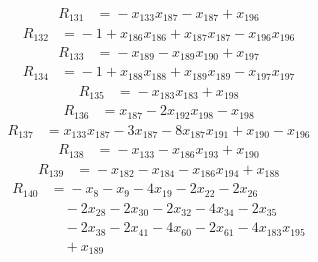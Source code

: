 \begin{align*}
R_{131}&={}-x_{133}x_{187} -x_{187} +x_{196}
\end{align*}
\begin{align*}
R_{132}&={}-1 +x_{186}x_{186} +x_{187}x_{187} -x_{196}x_{196}
\end{align*}
\begin{align*}
R_{133}&={}-x_{189} -x_{189}x_{190} +x_{197}
\end{align*}
\begin{align*}
R_{134}&={}-1 +x_{188}x_{188} +x_{189}x_{189} -x_{197}x_{197}
\end{align*}
\begin{align*}
R_{135}&={}-x_{183}x_{183} +x_{198}
\end{align*}
\begin{align*}
R_{136}&={}x_{187} -2x_{192}x_{198} -x_{198}
\end{align*}
\begin{align*}
R_{137}&={}x_{133}x_{187} -3x_{187} -8x_{187}x_{191} +x_{190} -x_{196}
\end{align*}
\begin{align*}
R_{138}&={}-x_{133} -x_{186}x_{193} +x_{190}
\end{align*}
\begin{align*}
R_{139}&={}-x_{182} -x_{184} -x_{186}x_{194} +x_{188}
\end{align*}
\begin{align*}
R_{140}&={}-x_{8} -x_{9} -4x_{19} -2x_{22} -2x_{26}\\
&\quad{}-2x_{28} -2x_{30} -2x_{32} -4x_{34} -2x_{35}\\
&\quad{}-2x_{38} -2x_{41} -4x_{60} -2x_{61} -4x_{183}x_{195}\\
&\quad{}+x_{189}
\end{align*}
